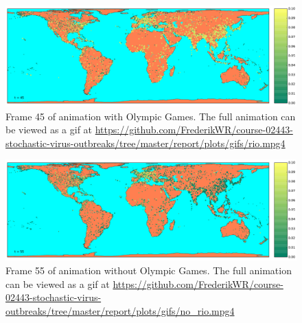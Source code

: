 \begin{figure}[H]
	\centering
	\includegraphics[width=1.0 \linewidth]{plots/gifs/frames/rio-45}
	\caption{Frame 45 of animation with Olympic Games. The full animation can be viewed as a gif at
		\url{https://github.com/FrederikWR/course-02443-stochastic-virus-outbreaks/tree/master/report/plots/gifs/rio.mpg4}}
\end{figure}

\begin{figure}[H]
	\centering
	\includegraphics[width=1.0 \linewidth]{plots/gifs/frames/noRio-55}
	\caption{Frame 55 of animation without Olympic Games. The full animation can be viewed as a gif at
		\url{https://github.com/FrederikWR/course-02443-stochastic-virus-outbreaks/tree/master/report/plots/gifs/no\_rio.mpg4}}
\end{figure}


